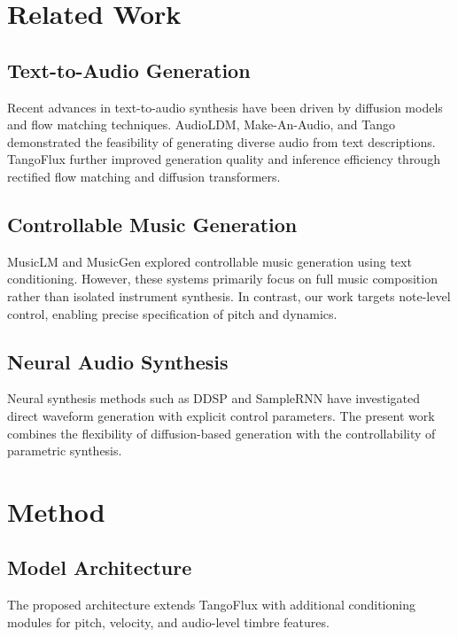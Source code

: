 \documentclass[11pt,a4paper]{article}
\begin{document}
\section{Related Work}

\subsection{Text-to-Audio Generation}

Recent advances in text-to-audio synthesis have been driven by diffusion models and flow matching techniques. AudioLDM, Make-An-Audio, and Tango demonstrated the feasibility of generating diverse audio from text descriptions. TangoFlux further improved generation quality and inference efficiency through rectified flow matching and diffusion transformers.

\subsection{Controllable Music Generation}

MusicLM and MusicGen explored controllable music generation using text conditioning. However, these systems primarily focus on full music composition rather than isolated instrument synthesis. In contrast, our work targets note-level control, enabling precise specification of pitch and dynamics.

\subsection{Neural Audio Synthesis}

Neural synthesis methods such as DDSP and SampleRNN have investigated direct waveform generation with explicit control parameters. The present work combines the flexibility of diffusion-based generation with the controllability of parametric synthesis.

\section{Method}

\subsection{Model Architecture}

The proposed architecture extends TangoFlux with additional conditioning modules for pitch, velocity, and audio-level timbre features.
\end{document}
